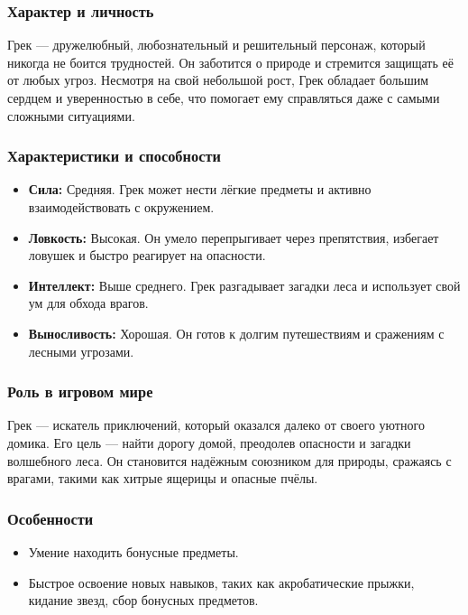 \documentclass{article}
\begin{document}
\subsubsection{Характер и личность} 
Грек — дружелюбный, любознательный и решительный персонаж, который никогда не боится трудностей. Он заботится о природе и стремится защищать её от любых угроз. Несмотря на свой небольшой рост, Грек обладает большим сердцем и уверенностью в себе, что помогает ему справляться даже с самыми сложными ситуациями.

\subsubsection{Характеристики и способности} 
\begin{itemize}
    \item \textbf{Сила:} Средняя. Грек может нести лёгкие предметы и активно взаимодействовать с окружением.
    \item \textbf{Ловкость:} Высокая. Он умело перепрыгивает через препятствия, избегает ловушек и быстро реагирует на опасности.
    \item \textbf{Интеллект:} Выше среднего. Грек разгадывает загадки леса и использует свой ум для обхода врагов.
    \item \textbf{Выносливость:} Хорошая. Он готов к долгим путешествиям и сражениям с лесными угрозами.
\end{itemize}

\subsubsection{Роль в игровом мире} 
Грек — искатель приключений, который оказался далеко от своего уютного домика. Его цель — найти дорогу домой, преодолев опасности и загадки волшебного леса. Он становится надёжным союзником для природы, сражаясь с врагами, такими как хитрые ящерицы и опасные пчёлы.

\subsubsection{Особенности} 
\begin{itemize}
    \item Умение находить бонусные предметы.
    \item Быстрое освоение новых навыков, таких как акробатические прыжки, кидание звезд, сбор бонусных предметов.
\end{itemize}
\end{document}
